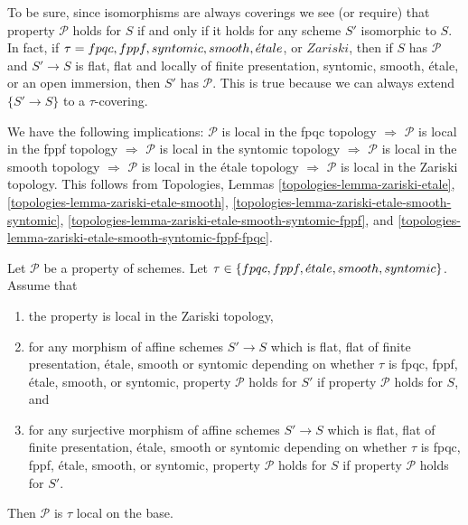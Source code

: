 \noindent
To be sure, since isomorphisms are always coverings
we see (or require) that property $\mathcal{P}$ holds for $S$
if and only if it holds for any scheme $S'$ isomorphic to $S$.
In fact, if $\tau = fpqc, \linebreak[0] fppf, \linebreak[0] syntomic,
\linebreak[0] smooth, \linebreak[0] \acute{e}tale$, or $Zariski$, then
if $S$ has $\mathcal{P}$ and $S' \to S$ is
flat, flat and locally of finite presentation, syntomic, smooth, \'etale, or
an open immersion, then $S'$ has $\mathcal{P}$. This is true because
we can always extend $\{S' \to S\}$ to a $\tau$-covering.

\medskip\noindent
We have the following implications:
$\mathcal{P}$ is local in the fpqc topology
$\Rightarrow$
$\mathcal{P}$ is local in the fppf topology
$\Rightarrow$
$\mathcal{P}$ is local in the syntomic topology
$\Rightarrow$
$\mathcal{P}$ is local in the smooth topology
$\Rightarrow$
$\mathcal{P}$ is local in the \'etale topology
$\Rightarrow$
$\mathcal{P}$ is local in the Zariski topology.
This follows from
Topologies, Lemmas
\ref{topologies-lemma-zariski-etale},
\ref{topologies-lemma-zariski-etale-smooth},
\ref{topologies-lemma-zariski-etale-smooth-syntomic},
\ref{topologies-lemma-zariski-etale-smooth-syntomic-fppf}, and
\ref{topologies-lemma-zariski-etale-smooth-syntomic-fppf-fpqc}.

\begin{lemma}
\label{lemma-descending-properties}
Let $\mathcal{P}$ be a property of schemes.
Let $\tau \in \{fpqc, \linebreak[0] fppf, \linebreak[0]
\acute{e}tale, \linebreak[0] smooth, \linebreak[0] syntomic\}$.
Assume that
\begin{enumerate}
\item the property is local in the Zariski topology,
\item for any morphism of affine schemes $S' \to S$
which is flat, flat of finite presentation,
\'etale, smooth or syntomic depending on whether $\tau$ is
fpqc, fppf, \'etale, smooth, or syntomic,
property $\mathcal{P}$ holds for $S'$ if property $\mathcal{P}$
holds for $S$, and
\item for any surjective morphism of affine schemes $S' \to S$
which is flat, flat of finite presentation,
\'etale, smooth or syntomic depending on whether $\tau$ is
fpqc, fppf, \'etale, smooth, or syntomic,
property $\mathcal{P}$ holds for $S$ if property $\mathcal{P}$
holds for $S'$.
\end{enumerate}
Then $\mathcal{P}$ is $\tau$ local on the base.
\end{lemma}

